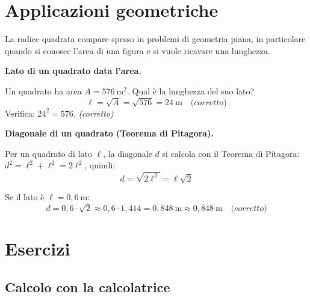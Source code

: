 \section{Applicazioni geometriche}

La radice quadrata compare spesso in problemi di geometria piana,
in particolare quando si conosce l'area di una figura e si vuole
ricavare una lunghezza.

\begin{esempio}
    \textbf{Lato di un quadrato data l'area.}

    Un quadrato ha area \(A = 576\ \text{m}^2\). Qual è la lunghezza del suo lato?
    \[
        \ell = \sqrt{A} = \sqrt{576} = 24\ \text{m}
        \quad \textit{(corretto)}
    \]
    Verifica: \(24^2 = 576\). \quad \textit{(corretto)}
\end{esempio}

\begin{esempio}
    \textbf{Diagonale di un quadrato (Teorema di Pitagora).}

    Per un quadrato di lato \(\ell\), la diagonale \(d\) si calcola con il
    Teorema di Pitagora: \(d^2 = \ell^2 + \ell^2 = 2\ell^2\), quindi:
    \[
        d = \sqrt{2\ell^2} = \ell\sqrt{2}
    \]

    Se il lato è \(\ell = 0{,}6\ \text{m}\):
    \[
        d = 0{,}6 \cdot \sqrt{2} \approx 0{,}6 \cdot 1{,}414 = 0{,}848\ \text{m}
        \approx 0{,}848\ \text{m}
        \quad \textit{(corretto)}
    \]
\end{esempio}

\section{Esercizi}

\subsection{Calcolo con la calcolatrice}

